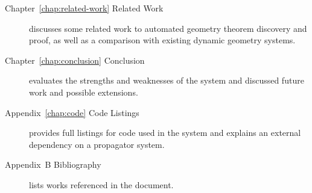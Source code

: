 \begin{description}
\item[Chapter~\ref{chap:related-work} Related Work] discusses some
  related work to automated geometry theorem discovery and proof, as
  well as a comparison with existing dynamic geometry systems.

\item[Chapter~\ref{chap:conclusion} Conclusion] evaluates the strengths and
  weaknesses of the system and discussed future work and possible extensions.

\item[Appendix~\ref{chap:code} Code Listings] provides full listings for code
  used in the system and explains an external dependency on a
  propagator system.

\item[Appendix~B Bibliography] lists works referenced in the document.

\end{description}

